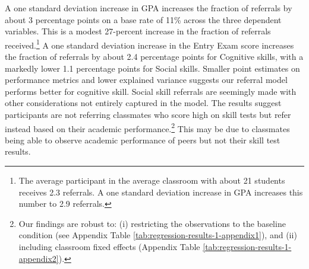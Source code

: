 \documentclass[11pt,a4paper,oneside]{article}
\begin{document}
A one standard deviation increase in GPA increases the fraction of referrals by about 3 percentage points on a base rate of 11\% across the three dependent variables. This is a modest 27-percent increase in the fraction of referrals received.\footnote{The average participant in the average classroom with about 21 students receives 2.3 referrals. A one standard deviation increase in GPA increases this number to 2.9 referrals.} A one standard deviation increase in the Entry Exam score increases the fraction of referrals by about 2.4 percentage points for Cognitive skills, with a markedly lower 1.1 percentage points for Social skills. Smaller point estimates on performance metrics and lower explained variance suggests our referral model performs better for cognitive skill. Social skill referrals are seemingly made with other considerations not entirely captured in the model. The results suggest participants are not referring classmates who score high on skill tests but refer instead based on their academic performance.\footnote{Our findings are robust to: (i) restricting the observations to the baseline condition (see Appendix Table \ref{tab:regression-results-1-appendix1}), and (ii) including classroom fixed effects (Appendix Table \ref{tab:regression-results-1-appendix2}).} This may be due to classmates being able to observe academic performance of peers but not their skill test results.

\end{document}

